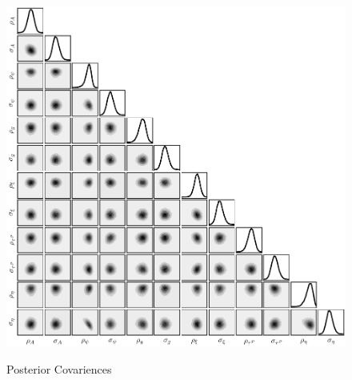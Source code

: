 \begin{figure}[ht]
    \centering
    \caption{Posterior Covariences}
    \includegraphics{figures/triangle.pdf}
    \label{fig:triangle}
\end{figure}
